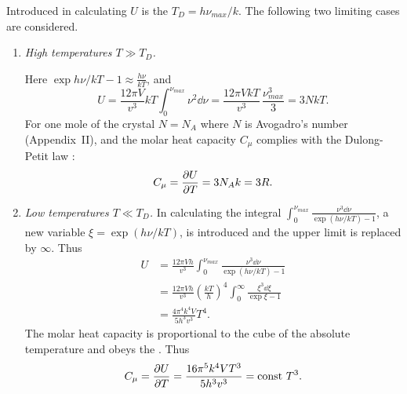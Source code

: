 Introduced in calculating $U$ is the  $T_{D} = h\nu_{max}/k$. The following two limiting cases are considered.
\begin{enumerate}[label = (\alph*)]
\item \emph{High temperatures $T \gg T_{D}$.}

Here $\exp h\nu / kT - 1 \approx \frac{h\nu}{kT}$, and 
\begin{equation*}%
U = \frac{12 \pi V}{v^{3}} kT \int_{0}^{\nu_{max}} \nu^{2} \dd \nu = \frac{12\pi V kT}{v^{3}}  \, \frac{\nu_{max}^{3}}{3} = 3 NkT.
\end{equation*}
For one mole of the crystal $N = N_{A}$ where $N$ is Avogadro's number (Appendix~II), and the molar heat capacity $C_{\mu}$ complies with the Dulong-Petit law :
\begin{equation*}%
C_{\mu} = \pdv{U}{T} = 3 N_{A} k=3R.
\end{equation*}
\item \emph{Low temperatures $T \ll T_{D}$.}
In calculating the integral $\int_{0}^{\nu_{max}} \frac{\nu^{3} \dd \nu}{\exp (h \nu/k T)-1}$, a new variable $\xi = \exp (h \nu/k T)$, is introduced and the upper limit is
replaced by $\infty$. Thus
\begin{align*}%
U & = \frac{12 \pi Vh}{v^{3}} \int_{0}^{\nu_{max}} \frac{\nu^{3} \dd \nu}{\exp (h \nu/k T)-1}\\
& = \frac{12 \pi V h}{v^{3}}  \left( \frac{kT}{h}\right)^{4} \int_{0}^{\infty} \frac{\xi^{3} \dd \xi}{\exp \xi - 1}\\
& = \frac{4 \pi^{4}k^{4}V}{5h^{3}v^{3}} T^{4}.
\end{align*}
The molar heat capacity is proportional to the cube of the absolute temperature and obeys the . Thus 
\begin{equation*}%
C_{\mu} = \pdv{U}{T} = \frac{16\pi^{5}k^{4}V T^{3}}{5 h^{3}v^{3}} = \text{const } T^{3}.
\end{equation*}

\end{enumerate}

